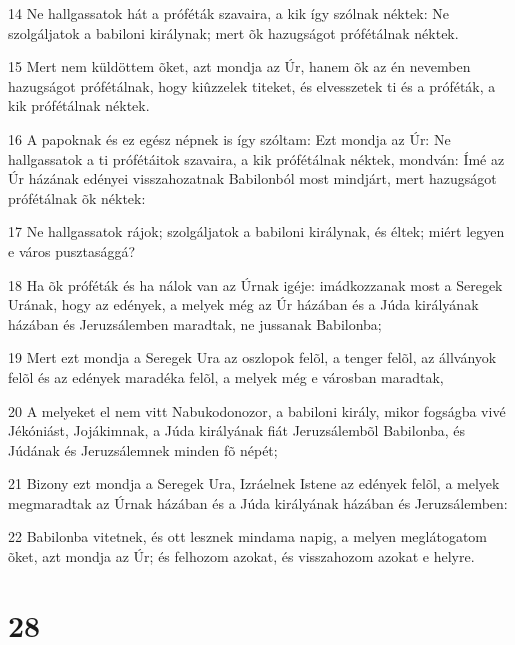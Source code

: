 \par 14 Ne hallgassatok hát a próféták szavaira, a kik így szólnak néktek: Ne szolgáljatok a babiloni királynak; mert õk hazugságot prófétálnak néktek.
\par 15 Mert nem küldöttem õket, azt mondja az Úr, hanem õk az én nevemben hazugságot prófétálnak, hogy kiûzzelek titeket, és elvesszetek ti és a próféták, a kik prófétálnak néktek.
\par 16 A papoknak és ez egész népnek is így szóltam: Ezt mondja az Úr: Ne hallgassatok a ti prófétáitok szavaira, a kik prófétálnak néktek, mondván: Ímé az Úr házának edényei visszahozatnak Babilonból most mindjárt, mert hazugságot prófétálnak õk néktek:
\par 17 Ne hallgassatok rájok; szolgáljatok a babiloni királynak, és éltek; miért legyen e város pusztasággá?
\par 18 Ha õk próféták és ha nálok van az Úrnak igéje: imádkozzanak most a Seregek Urának, hogy az edények, a melyek még az Úr házában és a Júda királyának házában és Jeruzsálemben maradtak, ne jussanak Babilonba;
\par 19 Mert ezt mondja a Seregek Ura az oszlopok felõl, a tenger felõl, az állványok felõl és az edények maradéka felõl, a melyek még e városban maradtak,
\par 20 A melyeket el nem vitt Nabukodonozor, a babiloni király, mikor fogságba vivé Jékóniást, Jojákimnak, a Júda királyának fiát Jeruzsálembõl Babilonba, és Júdának és Jeruzsálemnek minden fõ népét;
\par 21 Bizony ezt mondja a Seregek Ura, Izráelnek Istene az edények felõl, a melyek megmaradtak az Úrnak házában és a Júda királyának házában és Jeruzsálemben:
\par 22 Babilonba vitetnek, és ott lesznek mindama napig, a melyen  meglátogatom õket, azt mondja az Úr; és felhozom azokat, és visszahozom azokat e helyre.

\chapter{28}

